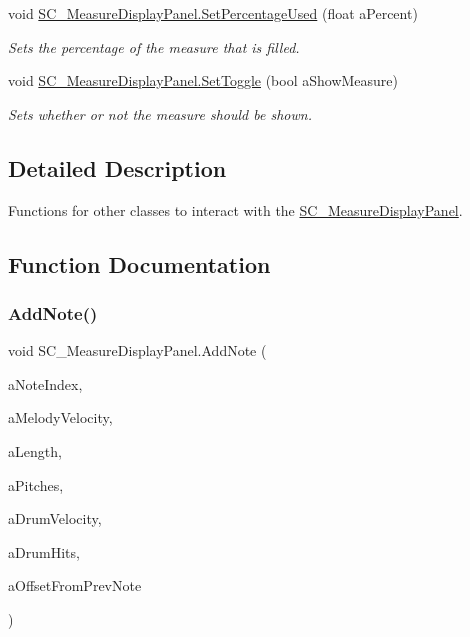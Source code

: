\begin{DoxyCompactItemize}
void \hyperlink{group___s_c___m_d_p_pub_func_gab8a32b1ba282d441cb1325d29f53dd1c}{S\+C\+\_\+\+Measure\+Display\+Panel.\+Set\+Percentage\+Used} (float a\+Percent)
\begin{DoxyCompactList}\small\item\em Sets the percentage of the measure that is filled. \end{DoxyCompactList}\item 
void \hyperlink{group___s_c___m_d_p_pub_func_ga6512fa5010bcecd85f7e8542cea91310}{S\+C\+\_\+\+Measure\+Display\+Panel.\+Set\+Toggle} (bool a\+Show\+Measure)
\begin{DoxyCompactList}\small\item\em Sets whether or not the measure should be shown. \end{DoxyCompactList}\end{DoxyCompactItemize}


\subsection{Detailed Description}
Functions for other classes to interact with the \hyperlink{class_s_c___measure_display_panel}{S\+C\+\_\+\+Measure\+Display\+Panel}. 

\subsection{Function Documentation}
\mbox{\label{group___s_c___m_d_p_pub_func_gadce2fd2e70d867b38c98305e2392b3df}} 
\subsubsection{\texorpdfstring{Add\+Note()}{AddNote()}}
{\footnotesize\ttfamily void S\+C\+\_\+\+Measure\+Display\+Panel.\+Add\+Note (\begin{DoxyParamCaption}\item[{int}]{a\+Note\+Index,  }\item[{int}]{a\+Melody\+Velocity,  }\item[{\hyperlink{group___music_enums_gaf11b5f079adbb21c800b9eca1c5c3cbd}{Music.\+N\+O\+T\+E\+\_\+\+L\+E\+N\+G\+TH}}]{a\+Length,  }\item[{\hyperlink{group___music_enums_ga508f69b199ea518f935486c990edac1d}{Music.\+P\+I\+T\+CH} \mbox{[}$\,$\mbox{]}}]{a\+Pitches,  }\item[{int}]{a\+Drum\+Velocity,  }\item[{\hyperlink{group___music_enums_gade475b4382c7066d1af13e7c13c029b6}{Music.\+D\+R\+UM} \mbox{[}$\,$\mbox{]}}]{a\+Drum\+Hits,  }\item[{\hyperlink{group___music_enums_gaf11b5f079adbb21c800b9eca1c5c3cbd}{Music.\+N\+O\+T\+E\+\_\+\+L\+E\+N\+G\+TH}}]{a\+Offset\+From\+Prev\+Note }\end{DoxyParamCaption})}



